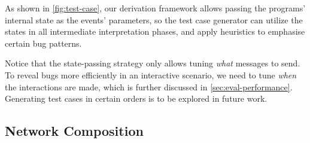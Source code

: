 As shown in \autoref{fig:test-case}, our derivation framework allows passing the
programs' internal state as the events' parameters, so the test case
generator can utilize the states in all intermediate interpretation phases, and
apply heuristics to emphasise certain bug patterns.


Notice that the state-passing strategy only allows tuning {\em what} messages to
send.  To reveal bugs more efficiently in an interactive scenario, we need to
tune {\em when} the interactions are made, which is further discussed in
\autoref{sec:eval-performance}.  Generating test cases in certain orders is to
be explored in future work.

\pagebreak
\subsection{Network Composition}

